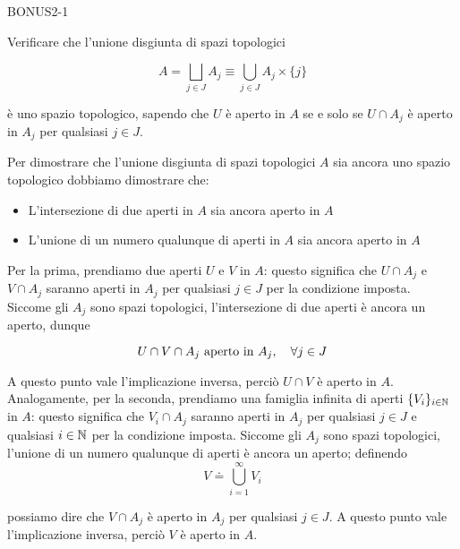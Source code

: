 {BONUS2-1}
{
Verificare che l'unione disgiunta di spazi topologici

\begin{equation}
	A = \bigsqcup_{j \in J} A_{j} \equiv \bigcup_{j \in J} A_{j} \times \{j\}
\end{equation}

è uno spazio topologico, sapendo che $ U $ è aperto in $ A $ se e solo se $ U \cap A_{j} $ è aperto in $ A_{j} $ per qualsiasi $ j \in J $.
}
{
Per dimostrare che l'unione disgiunta di spazi topologici $ A $ sia ancora uno spazio topologico dobbiamo dimostrare che:

\begin{itemize}
	\item L'intersezione di due aperti in $ A $ sia ancora aperto in $ A $
	
	\item L'unione di un numero qualunque di aperti in $ A $ sia ancora aperto in $ A $
\end{itemize}

Per la prima, prendiamo due aperti $ U $ e $ V $ in $ A $: questo significa che $ U \cap A_{j} $ e $ V \cap A_{j} $ saranno aperti in $ A_{j} $ per qualsiasi $ j \in J $ per la condizione imposta. Siccome gli $ A_{j} $ sono spazi topologici, l'intersezione di due aperti è ancora un aperto, dunque

\begin{equation}
	U \cap V \cap A_{j} \text{ aperto in } A_{j} \qcomma \forall j \in J
\end{equation}

A questo punto vale l'implicazione inversa, perciò $ U \cap V $ è aperto in $ A $. \\
Analogamente, per la seconda, prendiamo una famiglia infinita di aperti $ \{V_{i}\}_{i \in \mathbb{N}} $ in $ A $: questo significa che $ V_{i} \cap A_{j} $ saranno aperti in $ A_{j} $ per qualsiasi $ j \in J $ e qualsiasi $ i \in \mathbb{N} $ per la condizione imposta. Siccome gli $ A_{j} $ sono spazi topologici, l'unione di un numero qualunque di aperti è ancora un aperto; definendo
%
\begin{equation}
	V \doteq \bigcup_{i=1}^{\infty} V_{i}
\end{equation}

possiamo dire che $ V \cap A_{j} $ è aperto in $ A_{j} $ per qualsiasi $ j \in J $. A questo punto vale l'implicazione inversa, perciò $ V $ è aperto in $ A $.
}


